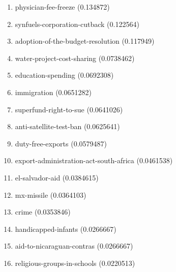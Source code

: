 \begin{enumerate}
\item physician-fee-freeze (0.134872)
\item synfuels-corporation-cutback (0.122564)
\item adoption-of-the-budget-resolution (0.117949)
\item water-project-cost-sharing (0.0738462)
\item education-spending (0.0692308)
\item immigration (0.0651282)
\item superfund-right-to-sue (0.0641026)
\item anti-satellite-test-ban (0.0625641)
\item duty-free-exports (0.0579487)
\item export-administration-act-south-africa (0.0461538)
\item el-salvador-aid (0.0384615)
\item mx-missile (0.0364103)
\item crime (0.0353846)
\item handicapped-infants (0.0266667)
\item aid-to-nicaraguan-contras (0.0266667)
\item religious-groups-in-schools (0.0220513)
\end{enumerate}